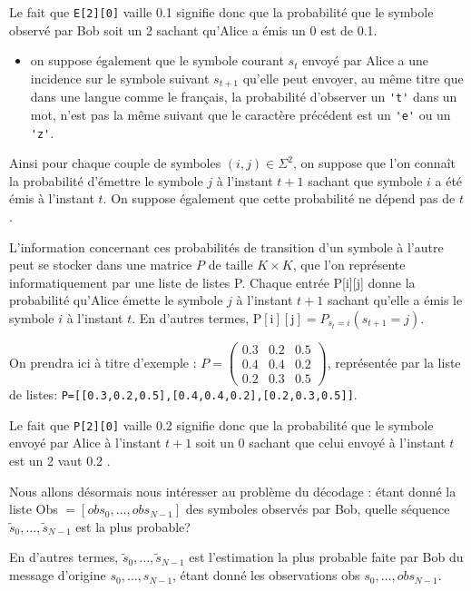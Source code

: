 Le fait que \lstinline{E[2][0]} vaille 0.1 signifie donc que la probabilité que le symbole observé par Bob soit un 2 sachant qu'Alice a émis un 0 est de 0.1.

\begin{itemize}
  \item on suppose également que le symbole courant $s_{t}$ envoyé par Alice a une incidence sur le symbole suivant $s_{t+1}$ qu'elle peut envoyer, au même titre que dans une langue comme le français, la probabilité d'observer un \lstinline{'t'} dans un mot, n'est pas la même suivant que le caractère précédent est un \lstinline{'e'} ou un \lstinline{'z'}.
\end{itemize}

Ainsi pour chaque couple de symboles $(i, j) \in \Sigma^{2}$, on suppose que l'on connaît la probabilité d'émettre le symbole $j$ à l'instant $t+1$ sachant que symbole $i$ a été émis à l'instant $t$. On suppose également que cette probabilité ne dépend pas de $t$.

L'information concernant ces probabilités de transition d'un symbole à l'autre peut se stocker dans une matrice $P$ de taille $K \times K$, que l'on représente informatiquement par une liste de listes P. Chaque entrée P[i][j] donne la probabilité qu'Alice émette le symbole $j$ à l'instant $t+1$ sachant qu'elle a émis le symbole $i$ à l'instant $t$. En d'autres termes, $\mathrm{P}[\mathrm{i}][\mathrm{j}]=P_{s_{t}=i}\left(s_{t+1}=j\right)$.

On prendra ici à titre d'exemple : $P=\left(\begin{array}{ccc}0.3 & 0.2 & 0.5 \\ 0.4 & 0.4 & 0.2 \\ 0.2 & 0.3 & 0.5\end{array}\right)$, représentée par la liste de listes: \lstinline{P=[[0.3,0.2,0.5],[0.4,0.4,0.2],[0.2,0.3,0.5]]}.

Le fait que \lstinline{P[2][0]} vaille 0.2 signifie donc que la probabilité que le symbole envoyé par Alice à l'instant $t+1$ soit un 0 sachant que celui envoyé à l'instant $t$ est un 2 vaut 0.2 .

Nous allons désormais nous intéresser au problème du décodage : étant donné la liste Obs $=\left[o b s_{0}, \ldots, o b s_{N-1}\right]$ des symboles observés par Bob, quelle séquence $\tilde{s}_{0}, \ldots, \tilde{s}_{N-1}$ est la plus probable?

En d'autres termes, $\tilde{s}_{0}, \ldots, \tilde{s}_{N-1}$ est l'estimation la plus probable faite par Bob du message d'origine $s_{0}, \ldots, s_{N-1}$, étant donné les observations obs $s_{0}, \ldots, o b s_{N-1}$.

